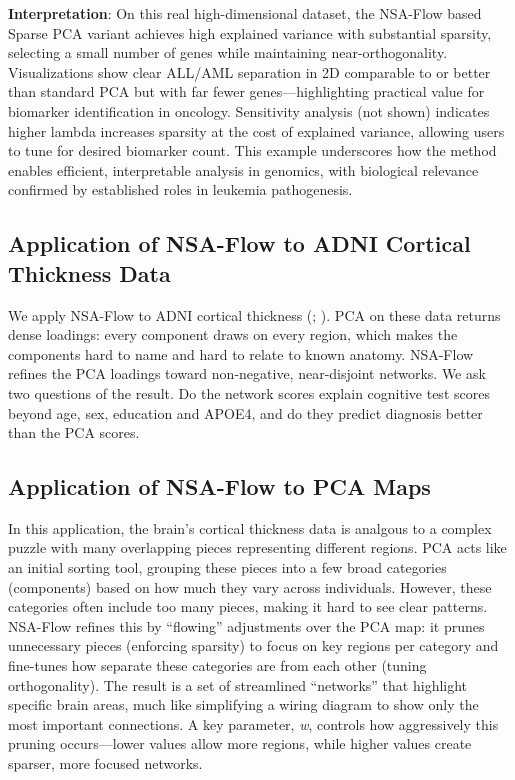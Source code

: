 \documentclass[
]{article}
\begin{document}
\textbf{Interpretation}: On this real high-dimensional dataset, the NSA-Flow based Sparse PCA variant achieves high explained variance with substantial sparsity, selecting a small number of genes while maintaining near-orthogonality. Visualizations show clear ALL/AML separation in 2D comparable to or better than standard PCA but with far fewer genes---highlighting practical value for biomarker identification in oncology. Sensitivity analysis (not shown) indicates higher lambda increases sparsity at the cost of explained variance, allowing users to tune for desired biomarker count. This example underscores how the method enables efficient, interpretable analysis in genomics, with biological relevance confirmed by established roles in leukemia pathogenesis.

\subsection{Application of NSA-Flow to ADNI Cortical Thickness Data}\label{application-of-nsa-flow-to-adni-cortical-thickness-data}

We apply NSA-Flow to ADNI cortical thickness (; ). PCA on these data returns dense loadings: every component draws on every region, which makes the components hard to name and hard to relate to known anatomy. NSA-Flow refines the PCA loadings toward non-negative, near-disjoint networks. We ask two questions of the result. Do the network scores explain cognitive test scores beyond age, sex, education and APOE4, and do they predict diagnosis better than the PCA scores.

\subsection{Application of NSA-Flow to PCA Maps}\label{application-of-nsa-flow-to-pca-maps}

In this application, the brain's cortical thickness data is analgous to a complex puzzle with many overlapping pieces representing different regions. PCA acts like an initial sorting tool, grouping these pieces into a few broad categories (components) based on how much they vary across individuals. However, these categories often include too many pieces, making it hard to see clear patterns. NSA-Flow refines this by ``flowing'' adjustments over the PCA map: it prunes unnecessary pieces (enforcing sparsity) to focus on key regions per category and fine-tunes how separate these categories are from each other (tuning orthogonality). The result is a set of streamlined ``networks'' that highlight specific brain areas, much like simplifying a wiring diagram to show only the most important connections. A key parameter, \emph{w}, controls how aggressively this pruning occurs---lower values allow more regions, while higher values create sparser, more focused networks.
\end{document}
